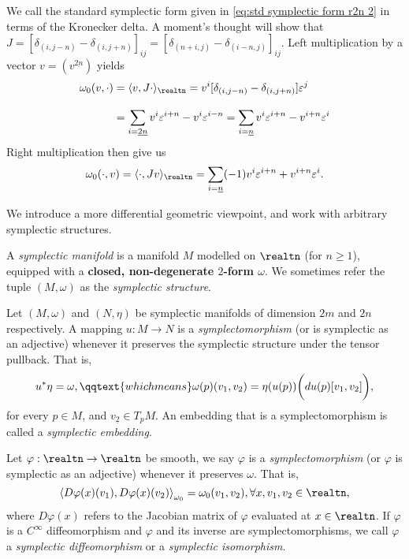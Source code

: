 \documentclass[../main-v2-manifolds.tex]{subfiles}
\begin{document}
%
%
\begin{note}\label{note: symplectic form summation computations}
    We call the standard symplectic form given in \cref{eq:std symplectic form r2n 2} in terms of the Kronecker delta. A moment's thought will show that $J = [\delta_{(i,j-n)} - \delta_{(i,j+n)}]_{ij} = [\delta_{(n+i,j)} - \delta_{(i-n,j)}]_{ij}$. Left multiplication by a vector $v = (v^{\underline{2n}})$ yields
    \begin{align*}
        \omega_0(v,\cdot) &= \langle v, J\cdot\rangle_{\realtn} = v^i[\delta_{(i,j-n)} - \delta_{(i,j+n)}]\varepsilon^j\\[2ex]
        &=\sum_{i=\underline{2n}}v^i\varepsilon^{i+n} - v^i\varepsilon^{i-n} =\sum_{i=\underline{n}}v^i\varepsilon^{i+n} - v^{i+n}\varepsilon^{i}
    \end{align*}
    Right multiplication then give us 
    \[
        \omega_0(\cdot, v) = \langle \cdot,Jv\rangle_{\realtn} = \sum_{i=\underline{n}}(-1)v^i\varepsilon^{i+n} + v^{i+n}\varepsilon^i.
    \]
\end{note}
We introduce a more differential geometric viewpoint, and work with arbitrary symplectic structures.
\begin{definition}\label{def:symplectic manifold}
    A \emph{symplectic manifold} is a manifold $M$ modelled on $\realtn$ (for $n\geq 1$), equipped with a \textbf{closed, non-degenerate $2$-form $\omega$}. We sometimes refer the tuple $(M,\omega)$ as the \emph{symplectic structure}.
\end{definition}
\begin{definition}[Symplectomorphism]
    Let $(M,\omega)$ and $(N,\eta)$ be symplectic manifolds of dimension $2m$ and $2n$ respectively. A mapping $u: M\to N$ is a \emph{symplectomorphism} (or is symplectic as an adjective) whenever it preserves the symplectic structure under the tensor pullback. That is,
    \[
        u^*\eta =\omega,\qqtext{which means} \omega(p)(v_1,v_2) = \eta(u(p))\biggl(du(p)[v_1,v_2]\biggr),
    \]
    for every $p\in M$, and $v_{\underline{2}}\in T_p M$. An embedding that is a symplectomorphism is called a \emph{symplectic embedding}.
\end{definition}
\begin{example}
Let $\varphi:\realtn\to\realtn$ be smooth, we say $\varphi$ is a \emph{symplectomorphism} (or $\varphi$ is symplectic as an adjective) whenever it preserves $\omega$. That is,
\[
    \left\langle D\varphi(x)(v_1), D\varphi(x)(v_2)\right\rangle_{\omega_0} = \omega_0(v_1, v_2),\forall x,v_1,v_2\in\realtn,
\]
where $D\varphi(x)$ refers to the Jacobian matrix of $\varphi$ evaluated at $x\in\realtn$. If $\varphi$ is a $C^\infty$ diffeomorphism and $\varphi$ and its inverse are symplectomorphisms, we call $\varphi$ a \emph{symplectic diffeomorphism} or a \emph{symplectic isomorphism}.
\end{example}
\end{document}
